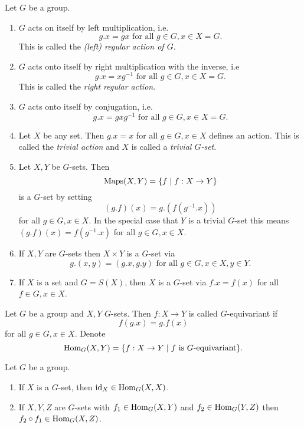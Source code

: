 \begin{expls}
 Let $G$ be a group.
 \begin{enumerate}
  \item
   $G$ acts on itself by left multiplication, i.e.
   \[
    g.x = gx \text{ for all } g \in G, x \in X=G.
   \]
   This is called the \emph{(left) regular action of $G$}.
  \item
   $G$ acts onto itself by right multiplication with the inverse, i.e
   \[
    g.x = xg^{-1} \text{ for all } g \in G, x \in X=G.
   \]
   This is called the \emph{right regular action}.
  \item
   $G$ acts onto itself by conjugation, i.e.
   \[
    g.x = gxg^{-1} \text{ for all }g \in G, x \in X=G.
   \]
  \item
   Let $X$ be any set. Then $g.x = x$ for all $g \in G, x \in X$ defines an action. This is called the \emph{trivial action} and $X$ is called a \emph{trivial $G$-set}.
  \item
   Let $X, Y$ be $G$-sets. Then
   \[
    \operatorname{Maps}(X,Y) = \{f \mid f : X \to Y\}
   \]
   is a $G$-set by setting
   \[
    (g.f)(x) = g.\left(f\left(g^{-1}.x\right)\right)
   \]
   for all $g \in G, x \in X$.
   In the special case that $Y$ is a trivial $G$-set this means $(g.f)(x) = f(g^{-1}.x)$ for all $g \in G, x \in X$.
  \item
   If $X, Y$ are $G$-sets then $X \times Y$ is a $G$-set via
   \[
    g.(x,y) = (g.x,g.y) \text{ for all } g \in G, x \in X, y \in Y.
   \]
  \item
   If $X$ is a set and $G = S(X)$, then $X$ is a $G$-set via $f.x = f(x)$ for all $f \in G, x \in X$.
 \end{enumerate}
\end{expls}


\begin{defi}
 Let $G$ be a group and $X, Y$ $G$-sets. Then $f : X \to Y$ is called $G$-equivariant if
 \[
  f(g.x) = g.f(x)
 \]
 for all $g \in G, x \in X$. Denote
 \[
  \operatorname{Hom}_G(X,Y) = \{f : X \to Y \mid f \text{ is $G$-equivariant}\}.
 \]
\end{defi}


\begin{lem}
 Let $G$ be a group.
 \begin{enumerate}
  \item If $X$ is a $G$-set, then $\operatorname{id}_X \in \operatorname{Hom}_G(X,X)$.
  \item If $X, Y, Z$ are $G$-sets with $f_1 \in \operatorname{Hom}_G(X,Y)$ and $f_2 \in \operatorname{Hom}_G(Y,Z)$ then $f_2 \circ f_1 \in \operatorname{Hom}_G(X,Z)$.
 \end{enumerate}
\end{lem}


